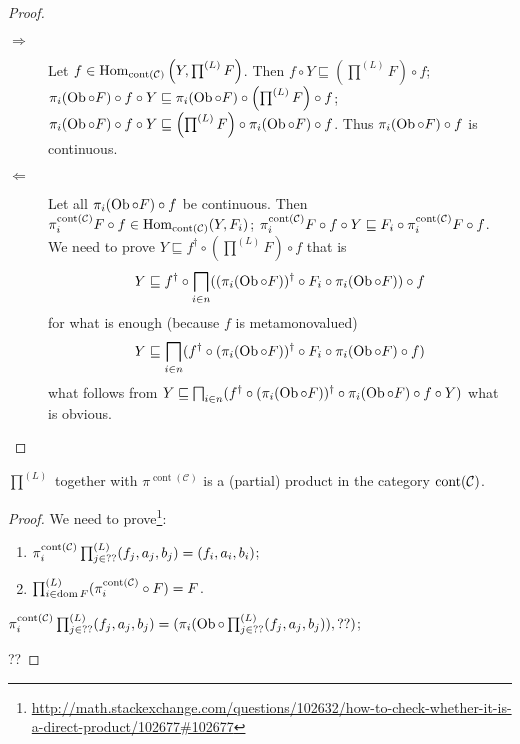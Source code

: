 \begin{proof}
  ~
  \begin{description}
    \item[$\Rightarrow$] Let $f \in \operatorname{Hom}_{\operatorname{cont}
    (\mathcal{C})} \left( Y , \prod^{(L)} F \right)$. Then $f \circ Y
    \sqsubseteq \left( \prod^{(L)} F \right) \circ f$; $\pi_i(\operatorname{Ob}\circ F) \circ f \circ Y
    \sqsubseteq \pi_i(\operatorname{Ob}\circ F) \circ \left( \prod^{(L)} F \right) \circ f$; $\pi_i(\operatorname{Ob}\circ F)
    \circ f \circ Y \sqsubseteq \left( \prod^{(L)} F \right) \circ \pi_i(\operatorname{Ob}\circ F) \circ
    f$. Thus $\pi_i(\operatorname{Ob}\circ F) \circ f$ is continuous.
    
    \item[$\Leftarrow$] Let all $\pi_i(\operatorname{Ob}\circ F) \circ f$ be continuous. Then
    $\pi^{\operatorname{cont} (\mathcal{C})}_i F \circ f \in
    \operatorname{Hom}_{\operatorname{cont} (\mathcal{C})} (Y , F_i)$;
    $\pi^{\operatorname{cont} (\mathcal{C})}_i F \circ f \circ Y \sqsubseteq
    F_i \circ \pi^{\operatorname{cont} (\mathcal{C})}_i F \circ f$. We need
    to prove $Y \sqsubseteq f^{\dagger} \circ \left( \prod^{(L)} F \right)
    \circ f$ that is
    \[ Y \sqsubseteq f^{\dagger} \circ \bigsqcap_{i \in n} ((\pi_i(\operatorname{Ob}\circ F))^{\dagger}
       \circ F_i \circ \pi_i(\operatorname{Ob}\circ F)) \circ f \]
    for what is enough (because $f$ is metamonovalued)
    \[ Y \sqsubseteq \bigsqcap_{i \in n} (f^{\dagger} \circ (\pi_i(\operatorname{Ob}\circ F))^{\dagger}
       \circ F_i \circ \pi_i(\operatorname{Ob}\circ F) \circ f) \]
    what follows from $Y \sqsubseteq \bigsqcap_{i \in n} (f^{\dagger} \circ
    (\pi_i(\operatorname{Ob}\circ F))^{\dagger} \circ \pi_i(\operatorname{Ob}\circ F) \circ f \circ Y)$ what is obvious.
  \end{description}
\end{proof}

\begin{thm}
  $\prod^{(L)}$ together with $\pi^{\operatorname{cont}(\mathcal{C})}$ is a (partial) product in the
  category $\operatorname{cont} (\mathcal{C})$.
\end{thm}

\begin{proof}
We need to prove\footnote{\url{http://math.stackexchange.com/questions/102632/how-to-check-whether-it-is-a-direct-product/102677\#102677}}:
\begin{enumerate}
\item $\pi^{\operatorname{cont}(\mathcal{C})}_i\prod^{(L)}_{j\in??}(f_j,a_j,b_j) = (f_i,a_i,b_i)$;
\item $\prod^{(L)}_{i\in\operatorname{dom} F}(\pi^{\operatorname{cont}(\mathcal{C})}_i\circ F) = F$.
\end{enumerate}

$\pi^{\operatorname{cont}(\mathcal{C})}_i\prod^{(L)}_{j\in??}(f_j,a_j,b_j) = (\pi_i(\operatorname{Ob}\circ \prod^{(L)}_{j\in??}(f_j,a_j,b_j)), ??)$;

??
\end{proof}

